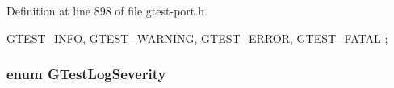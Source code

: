 \-Definition at line 898 of file gtest-\/port.\-h.


\begin{DoxyCode}
                      {
  GTEST_INFO,
  GTEST_WARNING,
  GTEST_ERROR,
  GTEST_FATAL
};
\end{DoxyCode}
\hypertarget{namespacetesting_1_1internal_ae0fec1ef790bf38b60329e0ca9538e9a}{
\subsubsection[{\-G\-Test\-Log\-Severity}]{\setlength{\rightskip}{0pt plus 5cm}enum {\bf \-G\-Test\-Log\-Severity}}}\label{d0/da7/namespacetesting_1_1internal_ae0fec1ef790bf38b60329e0ca9538e9a}
